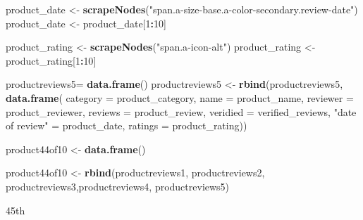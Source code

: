 \documentclass[
]{article}
\newenvironment{Shaded}{\begin{snugshade}}{\end{snugshade}}
\newcommand{\AttributeTok}[1]{\textcolor[rgb]{0.13,0.29,0.53}{#1}}
\newcommand{\DecValTok}[1]{\textcolor[rgb]{0.00,0.00,0.81}{#1}}
\newcommand{\FunctionTok}[1]{\textcolor[rgb]{0.13,0.29,0.53}{\textbf{#1}}}
\newcommand{\NormalTok}[1]{#1}
\newcommand{\OtherTok}[1]{\textcolor[rgb]{0.56,0.35,0.01}{#1}}
\newcommand{\SpecialCharTok}[1]{\textcolor[rgb]{0.81,0.36,0.00}{\textbf{#1}}}
\newcommand{\StringTok}[1]{\textcolor[rgb]{0.31,0.60,0.02}{#1}}
\begin{document}
\begin{Shaded}
\begin{Highlighting}[]
\NormalTok{  product\_date }\OtherTok{\textless{}{-}} \FunctionTok{scrapeNodes}\NormalTok{(}\StringTok{"span.a{-}size{-}base.a{-}color{-}secondary.review{-}date"}\NormalTok{)}
\NormalTok{  product\_date }\OtherTok{\textless{}{-}}\NormalTok{ product\_date[}\DecValTok{1}\SpecialCharTok{:}\DecValTok{10}\NormalTok{]}
  
\NormalTok{  product\_rating }\OtherTok{\textless{}{-}} \FunctionTok{scrapeNodes}\NormalTok{(}\StringTok{"span.a{-}icon{-}alt"}\NormalTok{)}
\NormalTok{  product\_rating }\OtherTok{\textless{}{-}}\NormalTok{ product\_rating[}\DecValTok{1}\SpecialCharTok{:}\DecValTok{10}\NormalTok{]}
  
\NormalTok{  productreviews5}\OtherTok{=} \FunctionTok{data.frame}\NormalTok{()}
\NormalTok{  productreviews5 }\OtherTok{\textless{}{-}} \FunctionTok{rbind}\NormalTok{(productreviews5, }\FunctionTok{data.frame}\NormalTok{(}
                      \AttributeTok{category =}\NormalTok{ product\_category,}
                      \AttributeTok{name =}\NormalTok{ product\_name,}
                      \AttributeTok{reviewer =}\NormalTok{ product\_reviewer,}
                      \AttributeTok{reviews =}\NormalTok{ product\_review,}
                      \AttributeTok{veridied =}\NormalTok{ verified\_reviews,}
                      \StringTok{"date of review"} \OtherTok{=}\NormalTok{ product\_date,}
                      \AttributeTok{ratings =}\NormalTok{ product\_rating))}
  
\NormalTok{  product44of10 }\OtherTok{\textless{}{-}} \FunctionTok{data.frame}\NormalTok{()}
  
\NormalTok{  product44of10 }\OtherTok{\textless{}{-}} \FunctionTok{rbind}\NormalTok{(productreviews1, productreviews2, productreviews3,productreviews4, productreviews5)}
\end{Highlighting}
\end{Shaded}

45th
\end{document}
